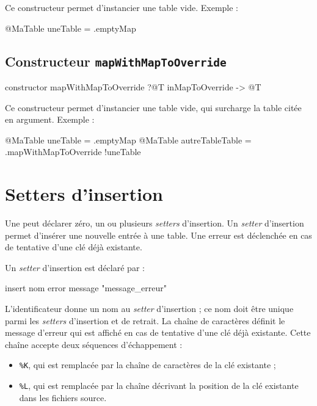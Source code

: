 Ce constructeur permet d'instancier une table vide. Exemple :
\begin{galgascode}
@MaTable uneTable = .emptyMap
\end{galgascode}

 

\subsection{Constructeur \texttt{mapWithMapToOverride}}

\begin{galgascode}
constructor mapWithMapToOverride ?@T inMapToOverride -> @T
\end{galgascode}

Ce constructeur permet d'instancier une table vide, qui surcharge la table  citée en argument. Exemple :
\begin{galgascode}
@MaTable uneTable = .emptyMap
@MaTable autreTableTable = .mapWithMapToOverride {!uneTable}
\end{galgascode}






\section{Setters d'insertion}

Une  peut déclarer zéro, un ou plusieurs \emph{setters} d'insertion. Un \emph{setter} d'insertion permet d'insérer une nouvelle entrée à une table. Une erreur est déclenchée en cas de tentative d'une clé déjà existante.


Un \emph{setter} d'insertion est déclaré par :

\begin{galgascode}
insert nom error message "message_erreur"
\end{galgascode}

L'identificateur  donne un nom au \emph{setter} d'insertion ; ce nom doit être unique parmi les \emph{setters} d'insertion et de retrait. La chaîne de caractères  définit le message d'erreur qui est affiché en cas de tentative d'une clé déjà existante. Cette chaîne accepte deux séquences d'échappement :
\begin{itemize}
  \item \colorbox{\couleurCodeGALGAS}{\texttt{\%K}}, qui est remplacée par la chaîne de caractères de la clé existante ;
  \item \colorbox{\couleurCodeGALGAS}{\texttt{\%L}}, qui est remplacée par la chaîne décrivant la position de la clé existante dans les fichiers source.
\end{itemize}


